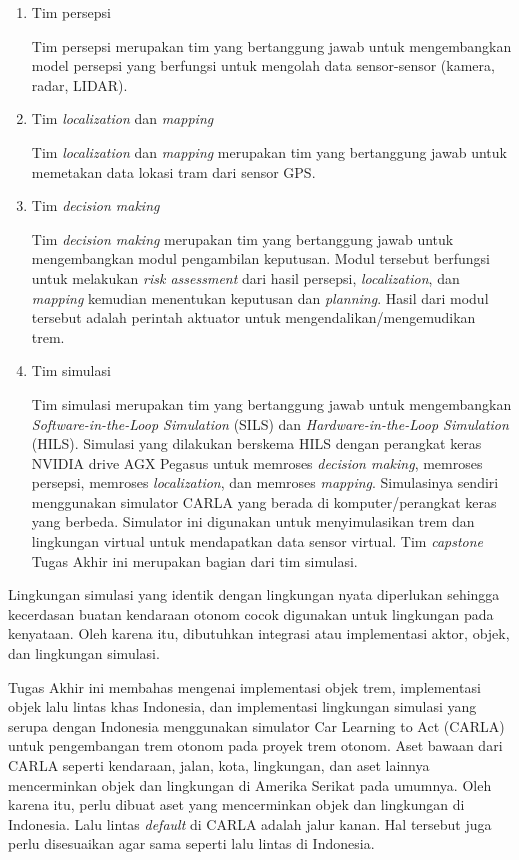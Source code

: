 \begin{enumerate}
    \item Tim persepsi

    Tim persepsi merupakan tim yang bertanggung jawab untuk mengembangkan model
    persepsi yang berfungsi untuk mengolah data sensor-sensor (kamera, radar,
    LIDAR).

    \item Tim \textit{localization} dan \textit{mapping}

    Tim \textit{localization} dan \textit{mapping} merupakan tim yang
    bertanggung jawab untuk memetakan data lokasi tram dari sensor GPS.

    \item Tim \textit{decision making}

    Tim \textit{decision making} merupakan tim yang bertanggung jawab untuk
    mengembangkan modul pengambilan keputusan. Modul tersebut berfungsi untuk
    melakukan \textit{risk assessment} dari hasil persepsi,
    \textit{localization}, dan \textit{mapping} kemudian menentukan keputusan
    dan \textit{planning}. Hasil dari modul tersebut adalah perintah aktuator
    untuk mengendalikan/mengemudikan trem.

    \item Tim simulasi

    Tim simulasi merupakan tim yang bertanggung jawab untuk mengembangkan
    \textit{Software-in-the-Loop Simulation} (SILS) dan
    \textit{Hardware-in-the-Loop Simulation} (HILS). Simulasi yang dilakukan
    berskema HILS dengan perangkat keras NVIDIA drive AGX Pegasus untuk memroses
    \textit{decision making}, memroses persepsi, memroses \textit{localization},
    dan memroses \textit{mapping}. Simulasinya sendiri menggunakan simulator
    CARLA yang berada di komputer/perangkat keras yang berbeda. Simulator ini
    digunakan untuk menyimulasikan trem dan lingkungan virtual untuk mendapatkan
    data sensor virtual. Tim \textit{capstone} Tugas Akhir ini merupakan bagian
    dari tim simulasi.

\end{enumerate}

Lingkungan simulasi yang identik dengan lingkungan nyata diperlukan sehingga
kecerdasan buatan kendaraan otonom cocok digunakan untuk lingkungan pada
kenyataan. Oleh karena itu, dibutuhkan integrasi atau implementasi aktor, objek,
dan lingkungan simulasi.

Tugas Akhir ini membahas mengenai implementasi objek trem, implementasi objek
lalu lintas khas Indonesia, dan implementasi lingkungan simulasi yang serupa
dengan Indonesia menggunakan simulator Car Learning to Act (CARLA) untuk
pengembangan trem otonom pada proyek trem otonom. Aset bawaan dari CARLA seperti
kendaraan, jalan, kota, lingkungan, dan aset lainnya mencerminkan objek dan
lingkungan di Amerika Serikat pada umumnya. Oleh karena itu, perlu dibuat aset
yang mencerminkan objek dan lingkungan di Indonesia. Lalu lintas
\textit{default} di CARLA adalah jalur kanan. Hal tersebut juga perlu
disesuaikan agar sama seperti lalu lintas di Indonesia.

